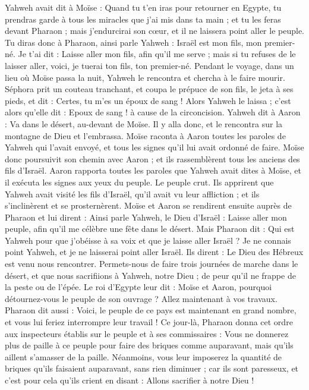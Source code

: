 \begin{multicols}{2}
Yahweh avait dit à Moïse : Quand tu t'en iras pour retourner en Egypte, tu prendras garde à tous les miracles que j'ai mis dans ta main ; et tu les feras devant Pharaon ; mais j'endurcirai son cœur, et il ne laissera point aller le peuple.
Tu diras donc à Pharaon, ainsi parle Yahweh : Israël est mon fils, mon premier-né\FTNT{}.
Je t'ai dit : Laisse aller mon fils, afin qu'il me serve ; mais si tu refuses de le laisser aller, voici, je tuerai ton fils, ton premier-né.
Pendant le voyage, dans un lieu où Moïse passa la nuit, Yahweh le rencontra et chercha à le faire mourir.
Séphora prit un couteau tranchant, et coupa le prépuce de son fils, le jeta à ses pieds, et dit : Certes, tu m'es un époux de sang !
Alors Yahweh le laissa ; c’est alors qu’elle dit : Epoux de sang ! à cause de la circoncision.
Yahweh dit à Aaron : Va dans le désert, au-devant de Moïse. Il y alla donc, et le rencontra sur la montagne de Dieu et l’embrassa.
Moïse raconta à Aaron toutes les paroles de Yahweh qui l'avait envoyé, et tous les signes qu'il lui avait ordonné de faire.
Moïse donc poursuivit son chemin avec Aaron ; et ils rassemblèrent tous les anciens des fils d'Israël.
Aaron rapporta toutes les paroles que Yahweh avait dites à Moïse, et il exécuta les signes aux yeux du peuple.
Le peuple crut. Ils apprirent que Yahweh avait visité les fils d'Israël, qu'il avait vu leur affliction ; et ils s'inclinèrent et se prosternèrent.
\VerseOne{}Moïse et Aaron se rendirent ensuite auprès de Pharaon et lui dirent : Ainsi parle Yahweh, le Dieu d'Israël : Laisse aller mon peuple, afin qu'il me célèbre une fête dans le désert.
Mais Pharaon dit : Qui est Yahweh pour que j'obéisse à sa voix et que je laisse aller Israël ? Je ne connais point Yahweh, et je ne laisserai point aller Israël.
Ils dirent : Le Dieu des Hébreux est venu nous rencontrer. Permets-nous de faire trois journées de marche dans le désert, et que nous sacrifiions à Yahweh, notre Dieu ; de peur qu'il ne frappe de la peste ou de l'épée.
Le roi d'Egypte leur dit : Moïse et Aaron, pourquoi détournez-vous le peuple de son ouvrage ? Allez maintenant à vos travaux.
Pharaon dit aussi : Voici, le peuple de ce pays est maintenant en grand nombre, et vous lui feriez interrompre leur travail !
Ce jour-là, Pharaon donna cet ordre aux inspecteurs établis sur le peuple et à ses commissaires :
Vous ne donnerez plus de paille à ce peuple pour faire des briques comme auparavant, mais qu'ils aillent s’amasser de la paille.
Néanmoins, vous leur imposerez la quantité de briques qu'ils faisaient auparavant, sans rien diminuer ; car ils sont paresseux, et c'est pour cela qu'ils crient en disant : Allons sacrifier à notre Dieu !

\end{multicols}
